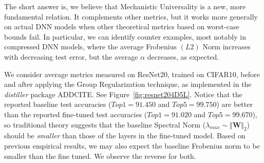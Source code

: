 The short answer is, we believe that Mechanistic Universality is a new, more fundamental relation. 
It complements other metrics, but it works more generally on actual DNN models when other theoretical metrics based on worst-case bounds fail. 
In particular, we can identify counter examples, most notably in compressed DNN models, where the average Frobenius $(L2)$ Norm increases with decreasing test error, but the average $\alpha$ decreases, as expected.  


We consider average metrics measured on ResNet20, trained on CIFAR10, before and after applying the Group Regularization technique, 
as implemented in the \emph{distiller} package ADDCITE. 
See Figure~\ref{fig:resnet204D5L}.
Notice that the reported baseline test accuracies ($Top1=91.450$ and $Top5=99.750$) 
are better than the reported fine-tuned test accuracies ($Top1=91.020$ and $Top5=99.670$), so traditional theory suggests that the baseline Spectral Norm
($\lambda_{max}\sim\Vert\mathbf{W}\Vert_{2}$) should be \emph{smaller} than those of the layers in the fine-tuned model.
Based on previous empirical results, we may also expect the baseline Frobenius norm to be smaller than the fine tuned.  We observe the reverse for both.


